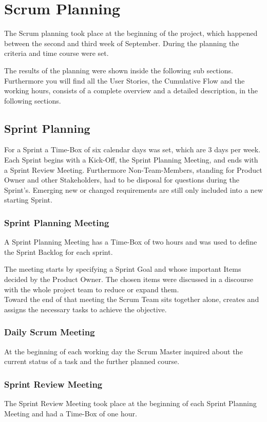 \section{Scrum Planning}
	The Scrum planning took place at the beginning of the project, which happened between the second and third week of September. During the planning the criteria and time course were set.
	
	The results of the planning were shown inside the following sub sections. Furthermore you will find all the User Stories, the Cumulative Flow and the working hours, consists of a complete overview and a detailed description, in the following sections.

	\subsection{Sprint Planning}
		For a Sprint a Time-Box of six calendar days was set, which are 3 days per week. Each Sprint begins with a Kick-Off, the Sprint Planning Meeting, and ends with a Sprint Review Meeting. Furthermore Non-Team-Members, standing for Product Owner and other Stakeholders, had to be disposal for questions during the Sprint's. Emerging new or changed requirements are still only included into a new starting Sprint.
		
		\subsubsection{Sprint Planning Meeting}
			A Sprint Planning Meeting has a Time-Box of two hours and was used to define the Sprint Backlog for each sprint.
			
			The meeting starts by specifying a Sprint Goal and whose important Items decided by the Product Owner. The chosen items were discussed in a discourse with the whole project team to reduce or expand them.\\
			Toward the end of that meeting the Scrum Team sits together alone, creates and assigns the necessary tasks to achieve the objective.
			
		\subsubsection{Daily Scrum Meeting}
			At the beginning of each working day the Scrum Master inquired about the current status of a task and the further planned course.

		\subsubsection{Sprint Review Meeting}
			The Sprint Review Meeting took place at the beginning of each Sprint Planning Meeting and had a Time-Box of one hour.